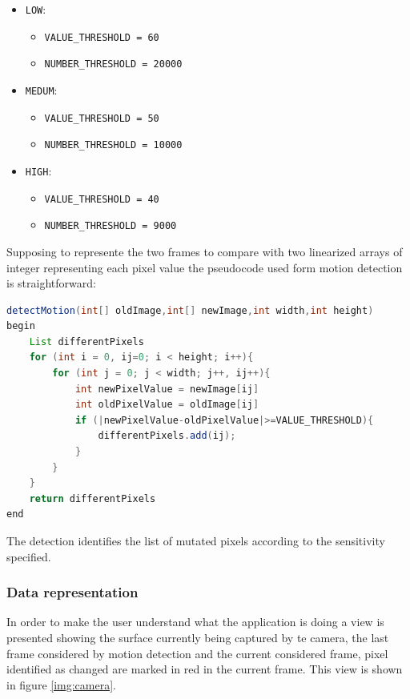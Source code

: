 \documentclass[conference]{IEEEtran}
\begin{document}
\begin{itemize}
	\item \texttt{LOW}:
		\begin{itemize}
		\item \texttt{VALUE\_THRESHOLD = 60}
		\item \texttt{NUMBER\_THRESHOLD = 20000}
		\end{itemize}
	\item \texttt{MEDUM}:
		\begin{itemize}
		\item \texttt{VALUE\_THRESHOLD = 50}
		\item \texttt{NUMBER\_THRESHOLD = 10000}
		\end{itemize}
	\item \texttt{HIGH}:
		\begin{itemize}
		\item \texttt{VALUE\_THRESHOLD = 40}
		\item \texttt{NUMBER\_THRESHOLD = 9000}
		\end{itemize}
\end{itemize}

Supposing to represente the two frames to compare with two linearized arrays of integer representing each pixel value the pseudocode used form motion detection is straightforward:

\begin{lstlisting}[language=Java, caption=Pseudocode for motion detection]
detectMotion(int[] oldImage,int[] newImage,int width,int height)
begin
	List differentPixels
	for (int i = 0, ij=0; i < height; i++){
		for (int j = 0; j < width; j++, ij++){
			int newPixelValue = newImage[ij]
			int oldPixelValue = oldImage[ij]
			if (|newPixelValue-oldPixelValue|>=VALUE_THRESHOLD){
	            differentPixels.add(ij);
			}
		}
	}
	return differentPixels		
end
\end{lstlisting}

The detection identifies the list of mutated pixels according to the sensitivity specified.\\

\subsubsection{\textbf{Data representation}}
In order to make the user understand what the application is doing a view is presented showing the surface currently being captured by te camera, the last frame considered by motion detection and the current considered frame, pixel identified as changed are marked in red in the current frame. This view is shown in figure \ref{img:camera}.\\
\end{document}
